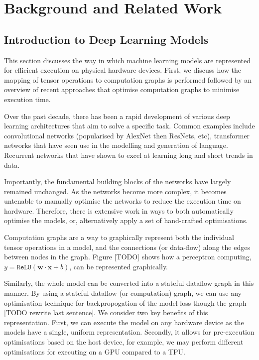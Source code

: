 \chapter{Background and Related Work}

\section{Introduction to Deep Learning Models}
This section discusses the way in which machine learning models are represented for efficient execution on physical hardware devices. First, we discuss how the mapping of tensor operations to computation graphs is performed followed by an overview of recent approaches that optimise computation graphs to minimise execution time.

Over the past decade, there has been a rapid development of various deep learning architectures that aim to solve a specific task. Common examples include convolutional networks (popularised by AlexNet then ResNets, etc), transformer networks that have seen use in the modelling and generation of language. Recurrent networks that have shown to excel at learning long and short trends in data.

Importantly, the fundamental building blocks of the networks have largely remained unchanged.  As the networks become more complex, it becomes untenable to manually optimise the networks to reduce the execution time on hardware. Therefore, there is extensive work in ways to both automatically optimise the models, or, alternatively apply a set of hand-crafted optimisations.

Computation graphs are a way to graphically represent both the individual tensor operations in a model, and the connections (or data-flow) along the edges between nodes in the graph. Figure [TODO] shows how a perceptron computing, $y = \texttt{ReLU}(\mathbf{w} \cdot \mathbf{x} + b)$, can be represented graphically.


Similarly, the whole model can be converted into a stateful dataflow graph in this manner. By using a stateful dataflow (or computation) graph, we can use any optimisation technique for backpropogation of the model loss though the graph [TODO rewrite last sentence]. We consider two key benefits of this representation. First, we can execute the model on any hardware device as the models have a single, uniform representation. Secondly, it allows for pre-execution optimisations based on the host device, for example, we may perform different optimisations for executing on a GPU compared to a TPU.

